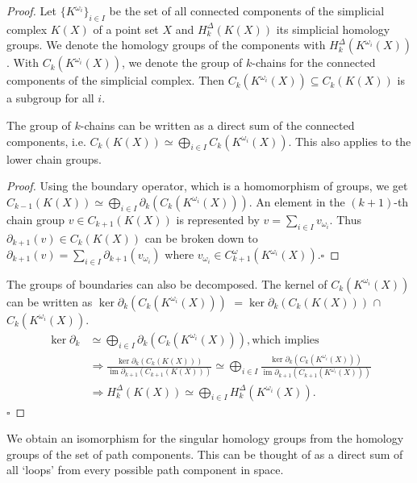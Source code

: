 \documentclass[envcountsect,runningheads]{llncs}
\DeclareMathOperator{\Ima}{im}
\renewcommand{\qed}{\hfill$\square$}
\begin{document}
\begin{proof}
Let $\{K^{\omega_{i}}\}_{i \in I}$ be the set of all connected components of the simplicial complex $K(X)$ of a point set $X$ and $H^{\Delta}_k\left(K\left(X\right)\right)$ its simplicial homology groups. We denote the homology groups of the components with $H_k^{\Delta}(K^{\omega_{i}}(X))$. With $C_k(K^{\omega_{i}}(X))$, we denote the group of $k$-chains for the connected components of the simplicial complex. Then $C_k(K^{\omega_{i}}(X)) \subseteq C_k(K(X))$ is a subgroup for all $i$.

\begin{lemma}
The group of $k$-chains can be written as a direct sum of the connected components, i.e. $C_k(K(X)) \simeq \bigoplus_{i \in I} C_k(K^{\omega_{i}}(X))$. This also applies to the lower chain groups.
\end{lemma}

\begin{proof}
Using the boundary operator, which is a homomorphism of groups, we get $C_{k-1}(K(X)) \simeq \bigoplus_{i \in I} \partial_k(C_{k}(K^{\omega_{i}}(X)))$. An element in the $(k+1)$-th chain group $v \in C_{k+1}(K(X))$ is represented by $v = \sum_{i \in I} v_{\omega_{i}}$. Thus $\partial_{k+1}(v) \in C_{k}(K(X))$ can be broken down to $\partial_{k+1}(v) = \sum_{i \in I} \partial_{k+1}(v_{\omega_{i}})$ where $v_{\omega_{i}} \in C^\omega_{k+1}(K^{\omega_{i}}(X))$.\qed
\end{proof}

The groups of boundaries can also be decomposed. The kernel of $C_k(K^{\omega_{i}}(X))$ can be written as $\ker \partial_k(C_k(K^{\omega_{i}}(X)))$ $= \ker \partial_k(C_k(K(X)))$ $\cap$ $C_k(K^{\omega_{i}}(X))$.
\begin{align}
	\ker \partial_k &\simeq \bigoplus_{i \in I} \partial_k\left(C_k\left(K^{\omega_{i}}(X)\right)\right), \text{which implies}\\
	&\Rightarrow \frac{\ker \partial_k\left(C_k\left(K\left(X\right)\right)\right)}{\Ima \partial_{k+1}\left(C_{k+1}\left(K\left(X\right)\right)\right)} \simeq \bigoplus_{i \in I} \frac{\ker \partial_k(C_k(K^{\omega_{i}}(X)))}{\Ima \partial_{k+1}(C_{k+1}(K^{\omega_{i}}(X)))}\\
	&\Rightarrow H^{\Delta}_k(K(X)) \simeq \bigoplus_{i \in I} H^{\Delta}_k(K^{\omega_{i}}(X)).
\end{align}
\qed
\end{proof}

\begin{remarklem}
We obtain an isomorphism for the singular homology groups from the homology groups of the set of path components. This can be thought of as a direct sum of all `loops' from every possible path component in space.
\end{remarklem}
\end{document}
